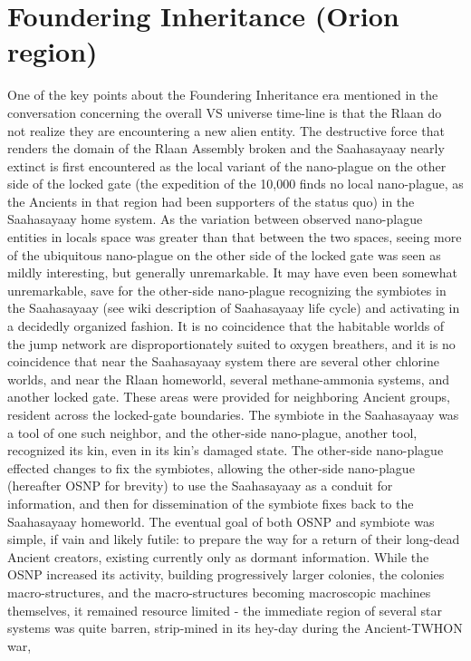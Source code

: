 \section{Foundering Inheritance (Orion region)}
One of the key points about the Foundering Inheritance era mentioned
in the conversation concerning the overall VS universe time-line is
that the Rlaan do not realize they are encountering a new alien
entity. The destructive force that renders the domain of the Rlaan
Assembly broken and the Saahasayaay nearly extinct is first
encountered as the local variant of the nano-plague on the other side
of the locked gate (the expedition of the 10,000 finds no local
nano-plague, as the Ancients in that region had been supporters of the
status quo) in the Saahasayaay home system. As the variation between
observed nano-plague entities in locals space was greater than that
between the two spaces, seeing more of the ubiquitous nano-plague on
the other side of the locked gate was seen as mildly interesting, but
generally unremarkable. It may have even been somewhat unremarkable,
save for the other-side nano-plague recognizing the symbiotes in the
Saahasayaay (see wiki description of Saahasayaay life cycle) and
activating in a decidedly organized fashion. It is no coincidence that
the habitable worlds of the jump network are disproportionately suited
to oxygen breathers, and it is no coincidence that near the
Saahasayaay system there are several other chlorine worlds, and near
the Rlaan homeworld, several methane-ammonia systems, and another
locked gate. These areas were provided for neighboring Ancient groups,
resident across the locked-gate boundaries. The symbiote in the
Saahasayaay was a tool of one such neighbor, and the other-side
nano-plague, another tool, recognized its kin, even in its kin's
damaged state. The other-side nano-plague effected changes to fix the
symbiotes, allowing the other-side nano-plague (hereafter OSNP for
brevity) to use the Saahasayaay as a conduit for information, and then
for dissemination of the symbiote fixes back to the Saahasayaay
homeworld. The eventual goal of both OSNP and symbiote was simple, if
vain and likely futile: to prepare the way for a return of their
long-dead Ancient creators, existing currently only as dormant
information. While the OSNP increased its activity, building
progressively larger colonies, the colonies macro-structures, and the
macro-structures becoming macroscopic machines themselves, it remained
resource limited - the immediate region of several star systems was
quite barren, strip-mined in its hey-day during the Ancient-TWHON war,
